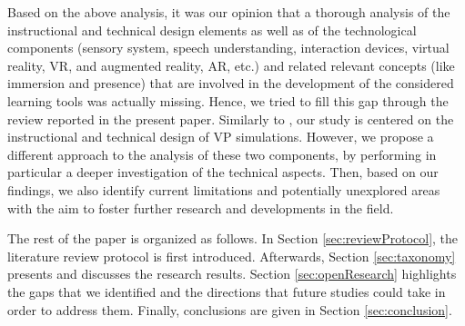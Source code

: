 Based on the above analysis, it was our opinion that a thorough analysis of the instructional and technical design elements as well as of the technological components (sensory system, speech understanding, interaction devices, virtual reality, VR, and augmented reality, AR, etc.) and related relevant concepts (like immersion and presence) that are involved in the development of the considered learning tools was actually missing. Hence, we tried to fill this gap through the review reported in the present paper. Similarly to \cite{lee2020effective}, our study is centered on the instructional and technical design of  VP simulations. However,  we propose a different approach to the analysis of these two components, by performing in particular a deeper investigation of the technical aspects. Then, based on our findings, we also identify current limitations and potentially unexplored areas with the aim to foster further research and developments in the field.

The rest of the paper is organized as follows. In Section \ref{sec:reviewProtocol}, the literature review protocol is first introduced. Afterwards, Section \ref{sec:taxonomy} presents and discusses the research results.  Section \ref{sec:openResearch}  highlights the gaps that we identified  and the directions that future studies could take in order to address
them. Finally, conclusions are given in Section \ref{sec:conclusion}.

%

